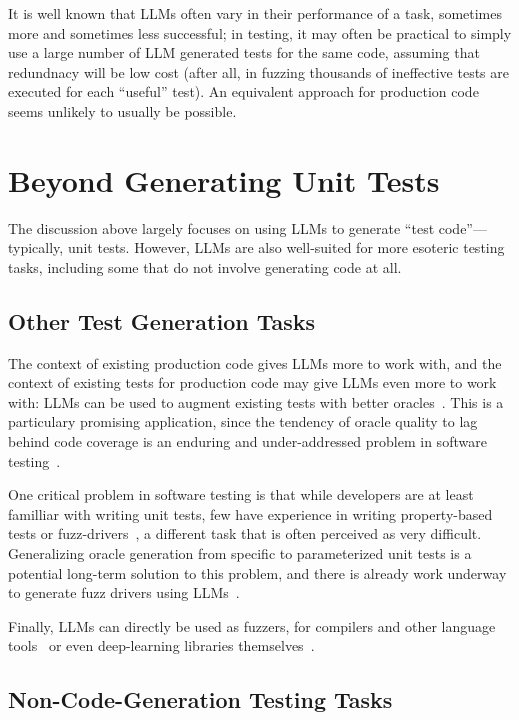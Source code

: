 \documentclass[sigconf,natbib=false]{acmart}
\begin{document}
It is well known that LLMs often vary in their performance of a task,
sometimes more and sometimes less successful; in testing, it may often
be practical to simply use a large number of LLM generated tests for
the same code, assuming that redundnacy will be low cost (after all,
in fuzzing thousands of ineffective tests are executed for each
``useful'' test).  An equivalent approach for production code seems
unlikely to usually be possible.


\section{Beyond Generating Unit Tests}

The discussion above largely focuses on using LLMs to generate ``test
code''---typically, unit tests.  However, LLMs are also well-suited
for more esoteric testing tasks, including some that do not involve
generating code at all.

\subsection{Other Test Generation Tasks}

The context of existing production code gives LLMs more to work with,
and the context of existing tests for production code may give LLMs
even more to work with: LLMs can be used to augment existing tests
with better oracles~\cite{OracleGEN}.  This is a particulary promising
application, since the tendency of oracle quality to lag behind code coverage
is an enduring and under-addressed problem in software testing~\cite{MindGap}.

One critical problem in software testing is that while developers are
at least familliar with writing unit tests, few have experience in
writing property-based tests or fuzz-drivers~\cite{goldstein2022some}, a different task
that is often perceived as very difficult.  Generalizing oracle
generation from specific to parameterized unit tests is a potential
long-term solution to this problem, and there is already work underway
to generate fuzz drivers using LLMs~\cite{zhang2023understanding}.

Finally, LLMs can directly be used as fuzzers, for compilers and other
language tools~\cite{xia2023universal} or even
deep-learning libraries themselves~\cite{LLMFuzz}.

\subsection{Non-Code-Generation Testing Tasks}
\end{document}
